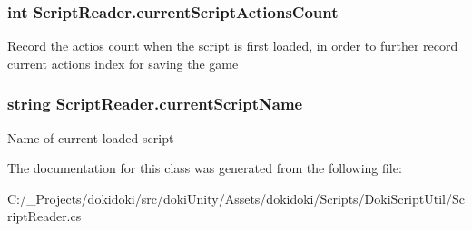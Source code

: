 \subsubsection[{\texorpdfstring{current\+Script\+Actions\+Count}{currentScriptActionsCount}}]{\setlength{\rightskip}{0pt plus 5cm}int Script\+Reader.\+current\+Script\+Actions\+Count}\hypertarget{class_script_reader_a48c647f1adf56637f27727921e9aef6f}{}\label{class_script_reader_a48c647f1adf56637f27727921e9aef6f}


Record the actios count when the script is first loaded, in order to further record current action\textquotesingle{}s index for saving the game 

\subsubsection[{\texorpdfstring{current\+Script\+Name}{currentScriptName}}]{\setlength{\rightskip}{0pt plus 5cm}string Script\+Reader.\+current\+Script\+Name}\hypertarget{class_script_reader_a3283923dbeb9c29dedec2f76fee03709}{}\label{class_script_reader_a3283923dbeb9c29dedec2f76fee03709}


Name of current loaded script 



The documentation for this class was generated from the following file\+:\begin{DoxyCompactItemize}
\item 
C\+:/\+\_\+\+Projects/dokidoki/src/doki\+Unity/\+Assets/dokidoki/\+Scripts/\+Doki\+Script\+Util/Script\+Reader.\+cs\end{DoxyCompactItemize}
